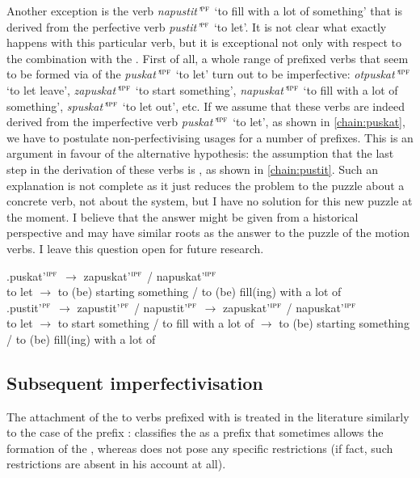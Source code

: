 Another exception is the verb \textit{napustit'}$^{\textsc{pf}}$ `to fill with a lot of something' that is derived from the perfective verb \textit{pustit'}$^{\textsc{pf}}$ `to let'. It is not clear what exactly happens with this particular verb, but it is exceptional not only with respect to the combination with the  . First of all, a whole range of prefixed verbs that seem to be formed via  of the  \textit{puskat'}$^{\textsc{ipf}}$ `to let' turn out to be imperfective: \textit{otpuskat'}$^{\textsc{ipf}}$ `to let leave', \textit{zapuskat'}$^{\textsc{ipf}}$ `to start something', \textit{napuskat'}$^{\textsc{ipf}}$ `to fill with a lot of something', \textit{spuskat'}$^{\textsc{ipf}}$ `to let out', etc. If we assume that these verbs are indeed derived from the imperfective verb \textit{puskat'}$^{\textsc{ipf}}$ `to let', as shown in \ref{chain:puskat}, we have to postulate non-perfectivising usages for a number of prefixes. This is an argument in favour of the alternative hypothesis: the assumption that the last step in the derivation of these verbs is , as shown in \ref{chain:pustit}. Such an explanation is not complete as it just reduces the problem to the puzzle about a concrete verb, not about the  system, but I have no solution for this new puzzle at the moment. I believe that the answer might be given from a historical perspective and may have similar roots as the answer to the puzzle of the motion verbs. I leave this question open for future research.

\exg.puskat'$^{\textsc{ipf}}$ $\rightarrow$ zapuskat'$^{\textsc{ipf}}$ / napuskat'$^{\textsc{ipf}}$ \label{chain:puskat}\\
{to let} $\rightarrow$ {to (be) starting something} / {to (be) fill(ing) with a lot of}\\

\exg.pustit'$^{\textsc{pf}}$ $\rightarrow$ zapustit'$^{\textsc{pf}}$ / napustit'$^{\textsc{pf}}$ $\rightarrow$ zapuskat'$^{\textsc{ipf}}$ / napuskat'$^{\textsc{ipf}}$ \label{chain:pustit}\\
{to let} $\rightarrow$ {to start something} / {to fill with a lot of} $\rightarrow$ {to (be) starting something} / {to (be) fill(ing) with a lot of}\\

\subsection{Subsequent imperfectivisation}
The attachment of the  to verbs prefixed with  is treated in the literature similarly to the case of the  prefix : \citet[230]{Svenonius:04b} classifies the   as a prefix that sometimes allows the formation of the , whereas \citet{Tatevosov:09} does not pose any specific restrictions (if fact, such restrictions are absent in his account at all).

